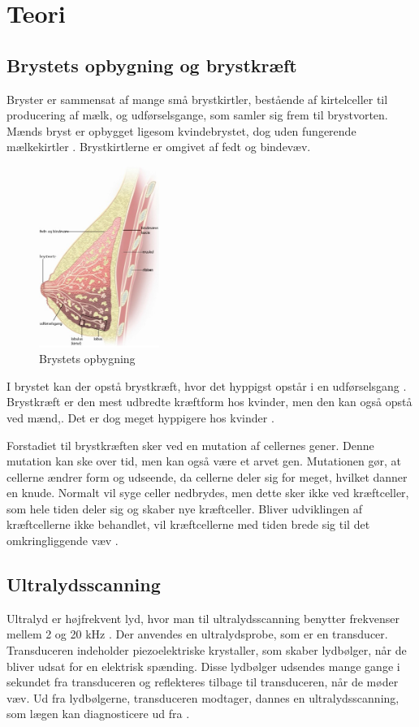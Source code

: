 \chapter{Teori}\label{Teori}

\section{Brystets opbygning og brystkræft}
Bryster er sammensat af mange små brystkirtler, bestående af kirtelceller til producering af mælk, og udførselsgange, som samler sig frem til brystvorten. Mænds bryst er opbygget ligesom kvindebrystet, dog uden fungerende mælkekirtler \cite{Mand}. Brystkirtlerne er omgivet af fedt og bindevæv\citep{Bryst}.

\begin{figure}[H]
    \centering
    \includegraphics[width=0.35\textwidth]{figurer/r/bryst}
    \caption{Brystets opbygning \citep{Bryst}}
    \label{Brystet}
\end{figure}

I brystet kan der opstå brystkræft, hvor det hyppigst opstår i en udførselsgang \citep{Bryst}. Brystkræft er den mest udbredte kræftform hos kvinder, men den kan også opstå ved mænd,. Det er dog meget hyppigere hos kvinder \cite{Mand}.

Forstadiet til brystkræften sker ved en mutation af cellernes gener. Denne mutation kan ske over tid, men kan også være et arvet gen. Mutationen gør, at cellerne ændrer form og udseende, da cellerne deler sig for meget, hvilket danner en knude. Normalt vil syge celler nedbrydes, men dette sker ikke ved kræftceller, som hele tiden deler sig og skaber nye kræftceller. Bliver udviklingen af kræftcellerne ikke behandlet, vil kræftcellerne med tiden brede sig til det omkringliggende væv \cite{Udvikling}. 

\section{Ultralydsscanning}
Ultralyd er højfrekvent lyd, hvor man til ultralydsscanning benytter frekvenser mellem 2 og 20 kHz \cite{Frekvens}. Der anvendes en ultralydsprobe, som er en transducer. Transduceren indeholder piezoelektriske krystaller, som skaber lydbølger, når de bliver udsat for en elektrisk spænding. Disse lydbølger udsendes mange gange i sekundet fra transduceren og reflekteres tilbage til transduceren, når de møder væv. Ud fra lydbølgerne, transduceren modtager, dannes en ultralydsscanning, som lægen kan diagnosticere ud fra \cite{Ultralydsscanning}.

